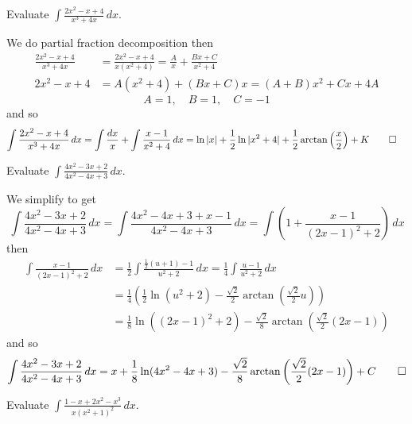 \begin{problem}
    Evaluate \(\displaystyle{\int\frac{2x^2-x+4}{x^3+4x}\,dx}\).
\end{problem}
\begin{solution}
    We do partial fraction decomposition then
    \begin{align*}
        \frac{2x^2-x+4}{x^3+4x} &= \frac{2x^2-x+4}{x(x^2+4)}
        =\frac{A}{x}+\frac{Bx+C}{x^2+4} \\
        2x^2-x+4 &= A(x^2+4)+(Bx+C)x=(A+B)x^2+Cx+4A
    \end{align*}
    \[A=1, \quad B=1,\quad C=-1\]
    and so
    \begin{align*}
        \int\frac{2x^2-x+4}{x^3+4x}\,dx
        &= \int\frac{dx}{x}+\int\frac{x-1}{x^2+4}\,dx
        =\ln|x|+\frac{1}{2}\ln|x^2+4|
        +\frac{1}{2}\arctan\left(\frac{x}{2}\right)+K \qedhere
    \end{align*}
\end{solution}
\begin{problem}
    Evaluate \(\displaystyle{\int\frac{4x^2-3x+2}{4x^2-4x+3}\,dx}\).
\end{problem}
\begin{solution}
    We simplify to get
    \[\int\frac{4x^2-3x+2}{4x^2-4x+3}\,dx
    =\int\frac{4x^2-4x+3+x-1}{4x^2-4x+3}\,dx
    =\int\left(1+\frac{x-1}{(2x-1)^2+2}\right)\,dx\]
    then
    \begin{align*}
        \int\frac{x-1}{(2x-1)^2+2}\,dx
        &= \frac{1}{2}\int\frac{\frac{1}{2}(u+1)-1}{u^2+2}\,dx
        =\frac{1}{4}\int\frac{u-1}{u^2+2}\,dx \\
        &= \frac{1}{4}\left(\frac{1}{2}\ln(u^2+2)
        -\frac{\sqrt{2}}{2}\arctan\left(\frac{\sqrt{2}}{2}u\right)\right) \\
        &= \frac{1}{8}\ln((2x-1)^2+2)
        -\frac{\sqrt{2}}{8}\arctan\left(\frac{\sqrt{2}}{2}(2x-1)\right)
    \end{align*}
    and so
    \[\int\frac{4x^2-3x+2}{4x^2-4x+3}\,dx
    =x+\frac{1}{8}\ln(4x^2-4x+3)
    -\frac{\sqrt{2}}{8}\arctan\left(\frac{\sqrt{2}}{2}(2x-1)\right)
    +C\qedhere\]
\end{solution}
\begin{problem}
    Evaluate \(\displaystyle{\int\frac{1-x+2x^2-x^3}{x(x^2+1)^2}\,dx}\).
\end{problem}
